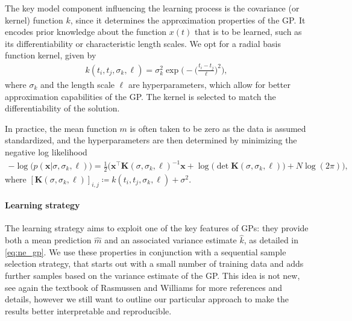 \documentclass[AMA,STIX1COL]{WileyNJD-v2}
\newcommand{\mb}[1]{\mathbf{#1}}
\newcommand{\T}{{\!\top}}
\begin{document}
The key model component influencing the learning process is the covariance (or kernel) function $k$, since it determines the approximation properties of the GP. It encodes prior knowledge about the function $x(t)$ that is to be learned, such as its differentiability or characteristic length scales. We opt for a radial basis function kernel, given by
\begin{align*}
    k(t_i, t_j, \sigma_k, \ell) = \sigma_k^2 \exp \biggl(- \Big( \frac{t_i - t_j}{\ell} \Big)^2 \biggr),
\end{align*}
where $\sigma_k$ and the length scale $\ell$ are hyperparameters, which allow for better approximation capabilities of the GP. The kernel is selected to match the differentiability of the solution.

In practice, the mean function $m$ is often taken to be zero as the data is assumed standardized, and the hyperparameters are then determined by minimizing the negative log likelihood\cite{basak2021}
\begin{align*}
    -\log \bigl( p(\mb{x} | \sigma, \sigma_k, \ell) \bigr) = \frac{1}{2} \big( \mb{x}^\T \mb{K}(\sigma, \sigma_k, \ell)^{-1} \mb{x} + \log \bigl( \det \mb{K}(\sigma, \sigma_k, \ell) \bigr) + N \log(2\pi) \big),
\end{align*}
where $[\mb{K}(\sigma, \sigma_k, \ell)]_{i,j} \coloneqq k(t_i, t_j, \sigma_k, \ell) + \sigma^2$.

\paragraph{Learning strategy}
The learning strategy aims to exploit one of the key features of GPs: they provide both a mean prediction $\hat{m}$ and an associated variance estimate $\hat{k}$, as detailed in \eqref{eq:ne_gp}. We use these properties in conjunction with a sequential sample selection strategy, that starts out with a small number of training data and adds further samples based on the variance estimate of the GP. This idea is not new, see again the textbook of Rasmussen and Williams\cite{rasmussen2006} for more references and details, however we still want to outline our particular approach to make the results better interpretable and reproducible.
\end{document}
